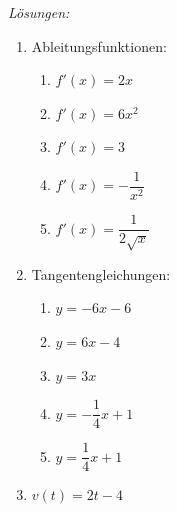 \pagebreak
\emph{Lösungen:}
\begin{enumerate}
    \item Ableitungsfunktionen:
    \begin{enumerate}
      \item \( f'(x) = 2x \)
      \item \( f'(x) = 6x^2 \)
      \item \( f'(x) = 3 \)
      \item \( f'(x) = -\dfrac{1}{x^2} \)
      \item \( f'(x) = \dfrac{1}{2\sqrt{x}} \)
    \end{enumerate}
  
    \item Tangentengleichungen:
    \begin{enumerate}
      \item \( y = -6x - 6 \)
      \item \( y = 6x - 4 \)
      \item \( y = 3x \)
      \item \( y = -\dfrac{1}{4}x + 1 \)
      \item \( y = \dfrac{1}{4}x +1\)
    \end{enumerate}
  
    \item $v(t) = 2t-4$ 
  \end{enumerate}

